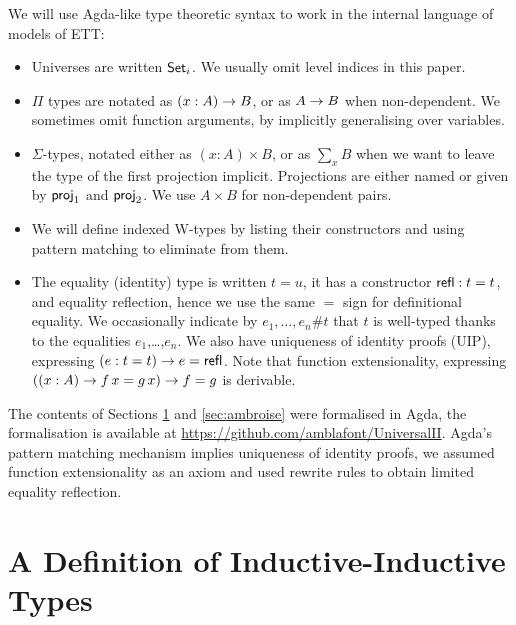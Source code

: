 \documentclass[a4paper,UKenglish,cleveref, autoref]{lipics-v2019}
\begin{document}
We will use Agda-like type theoretic syntax to work in the internal
language of models of ETT:
\begin{itemize}
\item Universes are written $\mathsf{Set}_i$. We usually omit level indices in this paper.
\item $\Pi$ types are notated as $(x : A)\rightarrow B$, or as $A \rightarrow B$ when
  non-dependent. We sometimes omit function arguments, by implicitly
  generalising over variables.
\item $\Sigma$-types, notated either as $(x : A)\times B$, or as
  $\sum\limits_{x} B$ when we want to leave the type of the first
  projection implicit. Projections are either named or given by
  $\mathsf{proj}_1$ and $\mathsf{proj}_2$. We use $A \times B$ for non-dependent
  pairs.
\item We will define indexed W-types \cite{indexedcont} by listing
  their constructors and using pattern matching to eliminate from
  them.
\item The equality (identity) type is written $t = u$, it has a
  constructor $\mathsf{refl} : t = t$, and equality reflection, hence we use
  the same $=$ sign for definitional equality. We occasionally
  indicate by $e_1,\dots,e_n \#t$ that $t$ is well-typed thanks to the
  equalities $e_1$,\dots,$e_n$. We also have uniqueness of identity
  proofs (UIP), expressing $(e : t = t)\rightarrow e = \mathsf{refl}$. Note that
  function extensionality, expressing
  $((x : A) \rightarrow f\,x = g\,x) \rightarrow f = g$ is derivable.
\end{itemize}

The contents of Sections \ref{sec:theory_of_signatures} and
\ref{sec:ambroise} were formalised in Agda, the formalisation is
available at \url{https://github.com/amblafont/UniversalII}. Agda's
pattern matching mechanism implies uniqueness of identity proofs, we
assumed function extensionality as an axiom and used rewrite rules
\cite{cockxsprinkles} to obtain limited equality reflection.


\section{A Definition of Inductive-Inductive Types}
\label{sec:theory_of_signatures}
\end{document}
